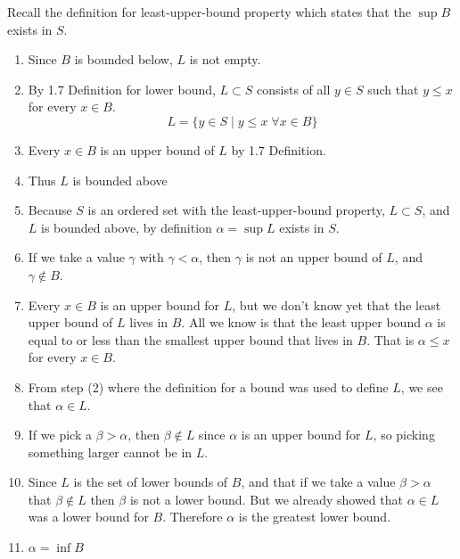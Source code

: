 \begin{proof-dan}
  Recall the definition for least-upper-bound property which states that the $\sup B$ exists in $S$.

  \begin{figure}[H]
    \begin{center}
    \end{center}
  \end{figure}

  \begin{enumerate}
    \item{Since $B$ is bounded below, $L$ is not empty.}
    \item{By 1.7 Definition for lower bound, $L\subset S$ consists of all $y\in S$ such that $y\leq x$ for every $x\in B$.}
    \begin{equation*}
      L=\{y\in S\;|\;y\leq x\;\forall x\in B\}
    \end{equation*}
    \item{Every $x\in B$ is an upper bound of $L$ by 1.7 Definition.}
    \item{Thus $L$ is bounded above}
    \item{Because $S$ is an ordered set with the least-upper-bound property, $L\subset S$, and $L$ is bounded above, by definition $\alpha=\sup L$ exists in $S$.}
    \item{If we take a value $\gamma$ with $\gamma<\alpha$, then $\gamma$ is not an upper bound of $L$, and $\gamma\notin B$.}
    \item{%
      Every $x\in B$ is an upper bound for $L$, but we don't know yet that the least upper bound of $L$ lives in $B$.
      All we know is that the least upper bound $\alpha$ is equal to or less than the smallest upper bound that lives in $B$.
      That is $\alpha\leq x$ for every $x\in B$.
    }
    \item{From step (2) where the definition for a bound was used to define $L$, we see that $\alpha\in L$.}
    \item{If we pick a $\beta>\alpha$, then $\beta\notin L$ since $\alpha$ is an upper bound for $L$, so picking something larger cannot be in $L$.}
    \item{%
      Since $L$ is the set of lower bounds of $B$, and that if we take a value $\beta>\alpha$ that $\beta\notin L$ then $\beta$ is not a lower bound.
      But we already showed that $\alpha\in L$ was a lower bound for $B$.
      Therefore $\alpha$ is the greatest lower bound.
    }
    \item{$\alpha=\inf B$}
  \end{enumerate}
\end{proof-dan}

